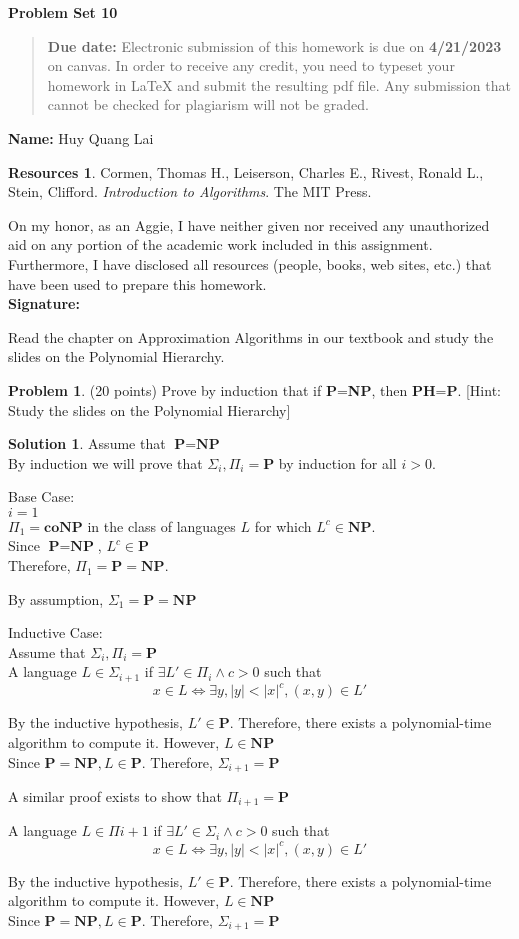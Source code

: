 \documentclass{article}
\theoremstyle{definition}
\newtheorem{problem}{Problem}
\newtheorem*{solution}{Solution}
\newtheorem*{resources}{Resources}
\newcommand{\name}[1]{\noindent\textbf{Name:} {#1}}
\newcommand{\honor}{\noindent On my honor, as an Aggie, I have neither
  given nor received any unauthorized aid on any portion of the
  academic work included in this assignment. Furthermore, I have
  disclosed all resources (people, books, web sites, etc.) that have
  been used to prepare this homework. \\[1ex]
 \textbf{Signature:} \underline{\hspace*{5cm}} }
\newcommand{\problemset}[1]{\begin{center}\textbf{Problem Set #1}\end{center}}
\newcommand{\duedate}[1]{\begin{quote}\textbf{Due date:} Electronic
    submission of this homework is due on \textbf{#1} on canvas. In
    order to receive any credit, you
    need to typeset your homework in LaTeX and submit the resulting
    pdf file. Any submission that cannot be checked for plagiarism will not
    be graded.\end{quote}}
\begin{document}
\problemset{10}
\duedate{4/21/2023}
\name{ Huy Quang Lai}
\begin{resources} Cormen, Thomas H., Leiserson, Charles E., Rivest, Ronald L., Stein, Clifford. \textit{Introduction to Algorithms}. The MIT Press.
\end{resources}
\honor

\newpage

Read the chapter on Approximation Algorithms in our textbook and study
the slides on the Polynomial Hierarchy. 


\begin{problem} (20 points) 
Prove by induction that if \textbf{P}=\textbf{NP}, then
\textbf{PH}=\textbf{P}. [Hint: Study the slides on the Polynomial Hierarchy]
\end{problem}
\begin{solution}
Assume that $\textbf{P}=\textbf{NP}$\\
By induction we will prove that $\Sigma_i,\Pi_i=\textbf{P}$ by induction for all $i>0$.

\noindent
Base Case:\\
$i=1$\\
$\Pi_1=\textbf{coNP}$ in the class of languages $L$ for which $L^c\in\textbf{NP}$.\\
Since $\textbf{P}=\textbf{NP}$, $L^c\in\textbf{P}$\\
Therefore, $\Pi_1=\textbf{P}=\textbf{NP}$.

\noindent
By assumption, $\Sigma_1=\textbf{P}=\textbf{NP}$

\noindent
Inductive Case:\\
Assume that $\Sigma_i,\Pi_i=\textbf{P}$\\
A language $L\in\Sigma_{i+1}$ if $\exists L'\in\Pi_i\land c>0$ such that
\[x\in L \Leftrightarrow\exists y,|y|<|x|^c,(x,y)\in L'\]

\noindent
By the inductive hypothesis, $L'\in \textbf{P}$. Therefore, there exists a polynomial-time algorithm to compute it. However, $L\in \textbf{NP}$\\
Since $\textbf{P}=\textbf{NP},L\in \textbf{P}$.
Therefore, $\Sigma_{i+1}=\textbf{P}$

\noindent
A similar proof exists to show that $\Pi_{i+1}=\textbf{P}$

\noindent
A language $L\in\Pi{i+1}$ if $\exists L'\in\Sigma_i\land c>0$ such that
\[x\in L \Leftrightarrow\exists y,|y|<|x|^c,(x,y)\in L'\]

\noindent
By the inductive hypothesis, $L'\in \textbf{P}$. Therefore, there exists a polynomial-time algorithm to compute it. However, $L\in \textbf{NP}$\\
Since $\textbf{P}=\textbf{NP},L\in \textbf{P}$.
Therefore, $\Sigma_{i+1}=\textbf{P}$
\end{solution}
\end{document}
